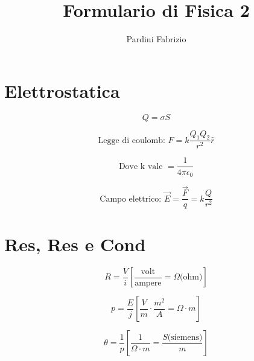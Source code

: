 \documentclass[a4paper,11pt]{article}
\begin{document}
	
	\setlength{\abovedisplayskip}{0pt}
	\setlength{\belowdisplayskip}{0pt}
	
	\title{\Large\bfseries Formulario di Fisica 2\vspace{-1em}}
	\author{Pardini Fabrizio\vspace{-1cm}}
	\date{}
	\maketitle
	
	\begin{multicols}{3}
		\setlength{\columnseprule}{0.03pt}
		\def\columnseprulecolor{\color{black}}
		
		\section{Elettrostatica}
		
		\begin{equation}
			Q=\sigma S
		\end{equation}
		
		\begin{equation}
			\text{Legge di coulomb: }F=k\frac{Q_{1}Q_{2}}{r^{2}}\hat{r}
		\end{equation}
		
		\begin{equation}
			\text{Dove k vale }=\frac{1}{4\pi\epsilon_{0}}
		\end{equation}
		
		
		\begin{equation}
			\text{Campo elettrico: }\vec{E}=\frac{\vec{F}}{q}=k\frac{Q}{r^{2}}
		\end{equation}
		
		
		\section{Res, Res e Cond}
		
		\begin{equation}
			R=\frac{V}{i} \left[
			\frac{\text{volt}}{\text{ampere}}=\Omega\text{(ohm)}
			\right]
		\end{equation}
		
		\begin{equation}
			p=\frac{E}{j} \left[
			\frac{V}{m} \cdot \frac{m^{2}}{A} = \Omega \cdot m
			\right]
		\end{equation}
		
		\begin{equation}
			\theta = \frac{1}{p} \left[
			\frac{1}{\Omega \cdot m} = \frac{S\text{(siemens)}}{m}
			\right]
		\end{equation}
		

\end{multicols}
\end{document}
